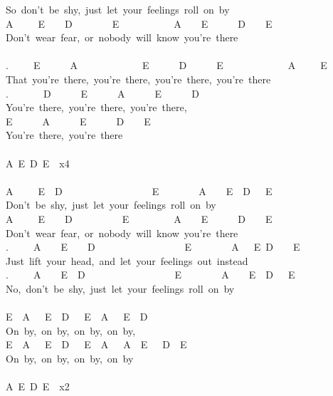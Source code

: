 {So\ don't\ be\ shy,\ just\ let\ your\ feelings\ roll\ on\ by\\
A\ \ \ \ \ E\ \ \ \ D\ \ \ \ \ \ \ \ E\ \ \ \ \ \ \ \ \ \ \ A\ \ \ \ E\ \ \ \ \ \ D\ \ \ \ E\\
Don't\ wear\ fear,\ or\ nobody\ will\ know\ you're\ there\\
\\
.\ \ \ \ \ E\ \ \ \ \ \ A\ \ \ \ \ \ \ \ \ \ \ \ \ E\ \ \ \ \ \ D\ \ \ \ \ \ E\ \ \ \ \ \ \ \ \ \ \ \ \ A\ \ \ \ \ E\\
That\ you're\ there,\ you're\ there,\ you're\ there,\ you're\ there\\
.\ \ \ \ \ \ \ D\ \ \ \ \ \ E\ \ \ \ \ \ A\ \ \ \ \ \ E\ \ \ \ \ \ D\\
You're\ there,\ you're\ there,\ you're\ there,\ \\
E\ \ \ \ \ \ A\ \ \ \ \ \ E\ \ \ \ \ \ D\ \ \ \ E\\
You're\ there,\ you're\ there\\
\\
A\ E\ D\ E\ \ x4\\
\\
A\ \ \ \ \ E\ \ D\ \ \ \ \ \ \ \ \ \ \ \ \ \ \ \ \ \ E\ \ \ \ \ \ \ \ A\ \ \ \ E\ \ D\ \ \ E\\
Don't\ be\ shy,\ just\ let\ your\ feelings\ roll\ on\ by\\
A\ \ \ \ \ E\ \ \ \ D\ \ \ \ \ \ \ \ \ \ E\ \ \ \ \ \ \ \ \ A\ \ \ \ E\ \ \ \ \ \ D\ \ \ \ E\\
Don't\ wear\ fear,\ or\ nobody\ will\ know\ you're\ there\\
.\ \ \ \ \ A\ \ \ \ E\ \ \ \ D\ \ \ \ \ \ \ \ \ \ \ \ \ \ \ \ \ \ E\ \ \ \ \ \ \ \ A\ \ \ E\ D\ \ \ \ E\\
Just\ lift\ your\ head,\ and\ let\ your\ feelings\ out\ instead\\
.\ \ \ \ \ A\ \ \ \ E\ \ D\ \ \ \ \ \ \ \ \ \ \ \ \ \ \ \ \ \ E\ \ \ \ \ \ \ \ A\ \ \ \ E\ \ D\ \ \ E\\
No,\ don't\ be\ shy,\ just\ let\ your\ feelings\ roll\ on\ by\\
\\
E\ \ A\ \ \ E\ \ D\ \ \ E\ \ A\ \ \ E\ \ D\\
On\ by,\ on\ by,\ on\ by,\ on\ by,\ \\
E\ \ A\ \ \ E\ \ D\ \ \ E\ \ A\ \ \ A\ \ E\ \ \ D\ \ E\\
On\ by,\ on\ by,\ on\ by,\ on\ by\\
\\
A\ E\ D\ E\ \ x2}


